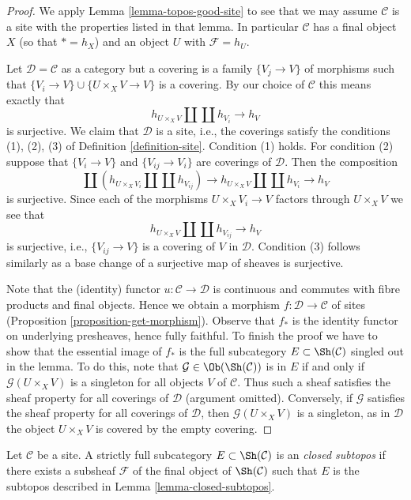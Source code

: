 \begin{proof}
We apply Lemma \ref{lemma-topos-good-site} to see that we may assume
$\mathcal{C}$ is a site with the properties listed in that lemma.
In particular $\mathcal{C}$ has a final object $X$ (so that
$* = h_X$) and an object $U$ with $\mathcal{F} = h_U$.

\medskip\noindent
Let $\mathcal{D} = \mathcal{C}$ as a category but a covering
is a family $\{V_j \to V\}$ of morphisms such that
$\{V_i \to V\} \cup \{U \times_X V \to V\}$ is a covering.
By our choice of $\mathcal{C}$ this means exactly that
$$
h_{U \times_X V} \amalg \coprod h_{V_i} \longrightarrow h_V
$$
is surjective. We claim that $\mathcal{D}$ is a site, i.e., the coverings
satisfy the conditions (1), (2), (3) of Definition \ref{definition-site}.
Condition (1) holds. For condition (2) suppose that
$\{V_i \to V\}$ and $\{V_{ij} \to V_i\}$ are coverings of $\mathcal{D}$.
Then the composition
$$
\coprod \left(
h_{U \times_X V_i} \amalg \coprod h_{V_{ij}}
\right) \longrightarrow
h_{U \times_X V} \amalg \coprod h_{V_i} \longrightarrow h_V
$$
is surjective. Since each of the morphisms $U \times_X V_i \to V$
factors through $U \times_X V$ we see that
$$
h_{U \times_X V} \amalg \coprod h_{V_{ij}} \longrightarrow h_V
$$
is surjective, i.e., $\{V_{ij} \to V\}$ is a covering of $V$ in
$\mathcal{D}$. Condition (3) follows similarly as a base change of
a surjective map of sheaves is surjective.

\medskip\noindent
Note that the (identity) functor $u : \mathcal{C} \to \mathcal{D}$ is
continuous and commutes with fibre products and final objects. Hence
we obtain a morphism $f : \mathcal{D} \to \mathcal{C}$ of sites
(Proposition \ref{proposition-get-morphism}).
Observe that $f_*$ is the identity functor on underlying
presheaves, hence fully faithful. To finish the proof we have to
show that the essential image of $f_*$ is the full subcategory
$E \subset \Sh(\mathcal{C})$ singled out in the lemma. To do this, note
that $\mathcal{G} \in \Ob(\Sh(\mathcal{C}))$ is in $E$ if and only if
$\mathcal{G}(U \times_X V)$ is a singleton for all objects
$V$ of $\mathcal{C}$. Thus such a sheaf satisfies the
sheaf property for all coverings of $\mathcal{D}$ (argument omitted).
Conversely, if $\mathcal{G}$ satisfies the sheaf property
for all coverings of $\mathcal{D}$, then $\mathcal{G}(U \times_X V)$
is a singleton, as in $\mathcal{D}$ the object $U \times_X V$ is
covered by the empty covering.
\end{proof}

\begin{definition}
\label{definition-closed-subtopos}
Let $\mathcal{C}$ be a site. A strictly full subcategory
$E \subset \Sh(\mathcal{C})$ is an {\it closed subtopos}
if there exists a subsheaf $\mathcal{F}$ of the final object
of $\Sh(\mathcal{C})$ such that $E$ is the subtopos
described in Lemma \ref{lemma-closed-subtopos}.
\end{definition}

